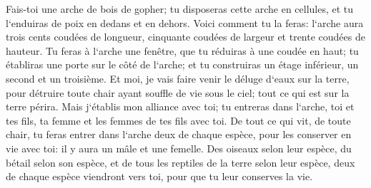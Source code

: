 \verse Fais-toi une arche de bois de gopher; tu disposeras cette arche en cellules, et tu l`enduiras de poix en dedans et en dehors. 
\verse Voici comment tu la feras: l`arche aura trois cents coudées de longueur, cinquante coudées de largeur et trente coudées de hauteur. 
\verse Tu feras à l`arche une fenêtre, que tu réduiras à une coudée en haut; tu établiras une porte sur le côté de l`arche; et tu construiras un étage inférieur, un second et un troisième. 
\verse Et moi, je vais faire venir le déluge d`eaux sur la terre, pour détruire toute chair ayant souffle de vie sous le ciel; tout ce qui est sur la terre périra. 
\verse Mais j`établis mon alliance avec toi; tu entreras dans l`arche, toi et tes fils, ta femme et les femmes de tes fils avec toi. 
\verse De tout ce qui vit, de toute chair, tu feras entrer dans l`arche deux de chaque espèce, pour les conserver en vie avec toi: il y aura un mâle et une femelle. 
\verse Des oiseaux selon leur espèce, du bétail selon son espèce, et de tous les reptiles de la terre selon leur espèce, deux de chaque espèce viendront vers toi, pour que tu leur conserves la vie. 
